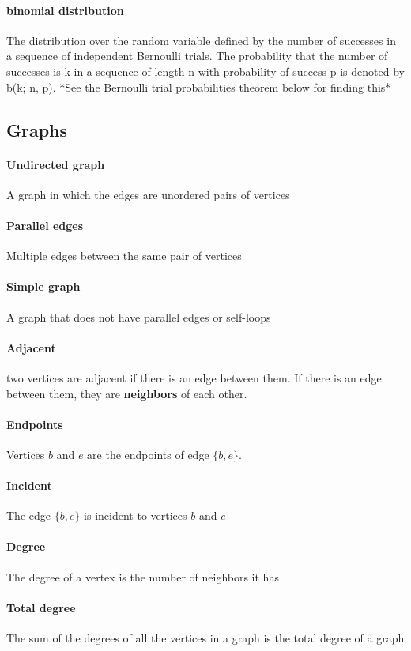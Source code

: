 \documentclass[a4paper]{article}
\begin{document}
  \paragraph{binomial distribution} The distribution over the random variable defined by the number of successes in a sequence of independent Bernoulli trials. The probability that the number of successes is k in a sequence of length n with probability of success p is denoted by b(k; n, p). *See the Bernoulli trial probabilities theorem below for finding this*
  \pagebreak
  \subsection{Graphs} 
  \paragraph{Undirected graph} A graph in which the edges are unordered pairs of vertices
  \paragraph{Parallel edges} Multiple edges between the same pair of vertices
  \paragraph{Simple graph} A graph that does not  have parallel edges or self-loops
  \paragraph{Adjacent} two vertices are adjacent if there is an edge between them. If there is an edge between them, they are \textbf{neighbors} of each other.
  \paragraph{Endpoints} Vertices $b$ and $e$ are the endpoints of edge $\{b, e\}$.
  \paragraph{Incident} The edge $\{b, e\}$ is incident to vertices $b$ and $e$
  \paragraph{Degree} The degree of a vertex is the number of neighbors it has
  \paragraph{Total degree} The sum of the degrees of all the vertices in a graph is the total degree of a graph
\end{document}
